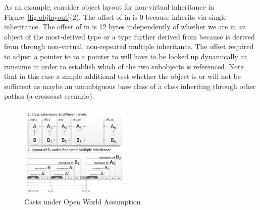 \noindent
%
As an example, consider object layout for non-virtual inheritance in 
Figure~\ref{fig:objlayout}(2). The offset of  in  is 0 because 
 inherits  via single inheritance. The offset of  in 
 is 12 bytes independently of whether we are in an object of the 
most-derived type  or a type further derived from  because 
 is derived from  through non-virtual, non-repeated multiple 
inheritance. The offset required to adjust a pointer to  to a pointer to 
 will have to be looked up dynamically at run-time in order to establish
which of the two subobjects is referenced. Note that in this case a simple 
additional test whether the object is  or  will not be 
sufficient as  maybe an unambiguous base class of a class inheriting 
 through other pathes (a crosscast scenario). %

\begin{figure}[htbp]
  \centering
    \includegraphics[width=0.47\textwidth]{Repeated.pdf}
  \caption{Casts under Open World Assumption}
  \label{fig:repeated}
\end{figure}

